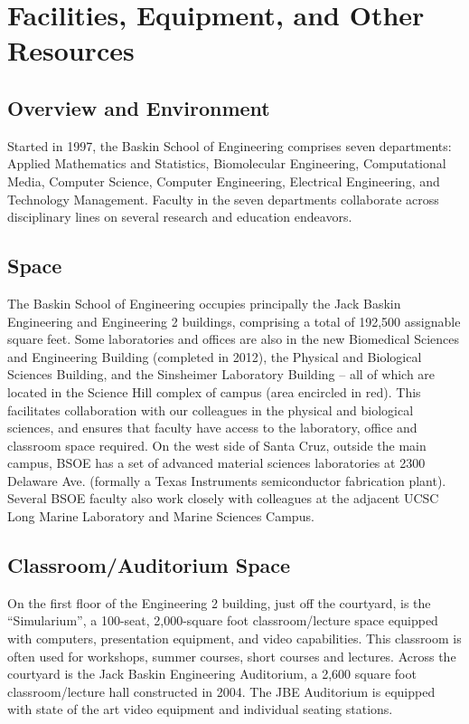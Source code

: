 \section*{Facilities, Equipment, and Other Resources}

\subsection*{Overview and Environment} Started in 1997, the Baskin School of Engineering comprises seven departments: Applied Mathematics and Statistics, Biomolecular Engineering, Computational Media, Computer Science, Computer Engineering, Electrical Engineering, and Technology Management. Faculty in the seven departments collaborate across disciplinary lines on several research and education endeavors.

\subsection*{Space} The Baskin School of Engineering occupies principally the Jack Baskin Engineering and Engineering 2 buildings, comprising a total of 192,500 assignable square feet. Some laboratories and offices are also in the new Biomedical Sciences and Engineering Building (completed in 2012), the Physical and Biological Sciences Building, and the Sinsheimer Laboratory Building – all of which are located in the Science Hill complex of campus (area encircled in red). This facilitates collaboration with our colleagues in the physical and biological sciences, and ensures that faculty have access to the laboratory, office and classroom space required. On the west side of Santa Cruz, outside the main campus, BSOE has a set of advanced material sciences laboratories at 2300 Delaware Ave. (formally a Texas Instruments semiconductor fabrication plant). Several BSOE faculty also work closely with colleagues at the adjacent UCSC Long Marine Laboratory and Marine Sciences Campus.

\subsection*{Classroom/Auditorium Space} On the first floor of the Engineering 2 building, just off the courtyard, is the “Simularium”, a 100-seat, 2,000-square foot classroom/lecture space equipped with computers, presentation equipment, and video capabilities. This classroom is often used for workshops, summer courses, short courses and lectures. Across the courtyard is the Jack Baskin Engineering Auditorium, a 2,600 square foot classroom/lecture hall constructed in 2004. The JBE Auditorium is equipped with state of the art video equipment and individual seating stations.


